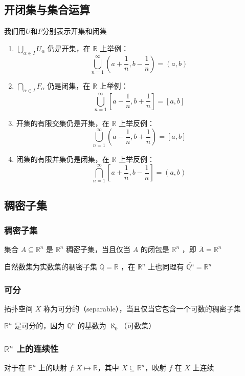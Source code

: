\documentclass{ctexbook}
\newcommand{\no}{\noindent}
\newcommand{\EXP}{\no {\bf 例}\quad}
\newcommand{\R}{\mathbb{R}}
\newcommand{\ITEMS}{\begin{enumerate}[leftmargin=4em]}
\newcommand{\ITEME}{\end{enumerate}}
\begin{document}
	
\subsection{开闭集与集合运算}
我们用$U$和$F$分别表示开集和闭集

\ITEMS
\item $\bigcup\limits_{\alpha\in I} U_\alpha$ 仍是开集，在 $\R$ 上举例：
\[
\bigcup_{n=1}^\infty\left(a+\frac1n,b-\frac1n\right)=(a,b)
\]

\item $\bigcap\limits_{\alpha\in I} F_\alpha$ 仍是闭集，在 $\R$ 上举例：
\[
\bigcup_{n=1}^\infty\left[a-\frac1n,b+\frac1n\right]=[a,b]
\]

\item 开集的有限交集仍是开集，在 $\R$ 上举反例：
\[
\bigcup_{n=1}^\infty\left(a-\frac1n,b+\frac1n\right)=[a,b]
\]

\item 闭集的有限并集仍是闭集，在 $\R$ 上举反例：
\[
\bigcap_{n=1}^\infty\left[a+\frac1n,b-\frac1n\right]=(a,b) %
\]
\ITEME

\subsection{稠密子集}
\subsubsection{稠密子集}

集合 $A\subseteq\R^n$ 是 $\R^n$ 稠密子集，当且仅当 $A$ 的闭包是 $\R^n$ ，即 $\overline A = \R^n$
\smallskip

\EXP 自然数集为实数集的稠密子集 $\overline{\mathbb{Q}} = \R$ ，在 $\R^n$ 上也同理有 $\overline{\mathbb{ Q}^n} = \R^n$

\subsubsection{可分}
拓扑空间 $X$ 称为可分的（separable），当且仅当它包含一个可数的稠密子集
\smallskip

\EXP $\R^n$ 是可分的，因为 $\mathbb{Q}^n$ 的基数为 $\aleph_0$（可数集）

\subsubsection{ $\R^n$ 上的连续性}

对于在 $\R^n$ 上的映射 $f:X\mapsto\R$，其中 $X\subseteq\R^n$，映射 $f$ 在 $X$ 上连续





\end{document}
